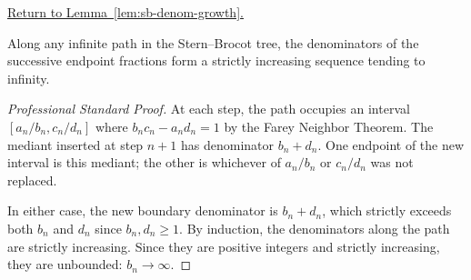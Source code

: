 
\newpage
{}
\label{prf:sb-denom-growth}

\begin{remark*}[Return]
\hyperref[lem:sb-denom-growth]{Return to Lemma~\ref*{lem:sb-denom-growth}.}
\end{remark*}

\begin{lemma*}
Along any infinite path in the Stern--Brocot tree, the denominators of
the successive endpoint fractions form a strictly increasing sequence
tending to infinity.
\end{lemma*}

\begin{proof}[Professional Standard Proof]
\LRAProofBodyStart
At each step, the path occupies an interval $[a_n/b_n, c_n/d_n]$ where
$b_n c_n - a_n d_n = 1$ by the Farey Neighbor Theorem.  The mediant
inserted at step $n+1$ has denominator $b_n + d_n$.  One endpoint of the
new interval is this mediant; the other is whichever of $a_n/b_n$ or
$c_n/d_n$ was not replaced.

In either case, the new boundary denominator is $b_n + d_n$, which
strictly exceeds both $b_n$ and $d_n$ since $b_n, d_n \geq 1$.  By
induction, the denominators along the path are strictly increasing.
Since they are positive integers and strictly increasing, they are
unbounded: $b_n \to \infty$.
\end{proof}

